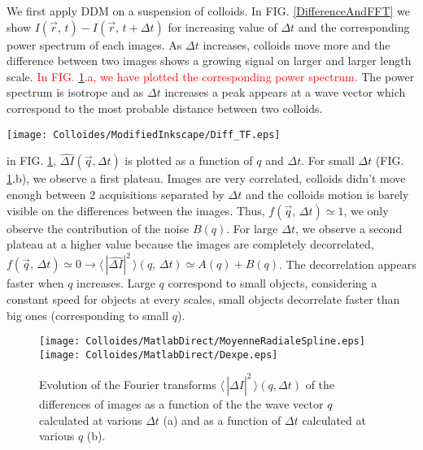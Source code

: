 \documentclass[%
 aip,
 jmp,%
 amsmath,amssymb,
reprint,%
]{revtex4-1}
\begin{document}
We first apply DDM on a suspension of colloids. In FIG. \ref{DifferenceAndFFT} we show $I(\vec{r}, \, t)- I(\vec{r}, \, t+\Delta t)$ for increasing value of $\Delta t$ and the corresponding power spectrum of each images. As $\Delta t$ increases, colloids move more and the difference between two images shows a growing signal on larger and larger length scale. \textcolor{red}{In FIG. \ref{D}.a, we have plotted the corresponding power spectrum.} The power spectrum is isotrope and as $\Delta t$ increases a peak appears at a wave vector which correspond to the most probable distance between two colloids. 

\begin{figure*}
\texttt{[image: Colloides/ModifiedInkscape/Diff\_TF.eps]}
\caption{Image differences of a colloidal suspension and their Fourier transform as a function of $\Delta t$. (a, b, c) Differences between 2 images separated by $\Delta t$. (d, e, f) 2D Fourier transforms of those differences. These differences and Fourier transforms are calculated with $\Delta t = 0.01$ s (a, d), $\Delta t = 1$ s (b, e), $\Delta t = 100$ s (c, f). The unit of the Fourier transforms is arbitrary.}
\label{DifferenceAndFFT}
\end{figure*}


in FIG. \ref{D}, $\widehat{\Delta I}(\vec{q}, \Delta t)$ is plotted as a function of $q$ and $\Delta t$. For small $\Delta t$ (FIG. \ref{D}.b), we observe a first plateau. Images are very correlated, colloids didn't move enough between 2 acquisitions separated by $\Delta t$ and the colloids motion is barely visible on the differences between the images. Thus, $f(\vec{q}, \, \Delta t) \simeq 1$,  we only observe the contribution of the noise $B(q)$. For large $\Delta t$, we observe a second plateau at a higher value because the images are completely decorrelated, $f(\vec{q}, \, \Delta t) \simeq 0 \rightarrow \langle \, |\widehat{\Delta I}|^2 \, \rangle (q, \, \Delta t) \simeq A(q)+B(q)$. The decorrelation appears faster when $q$ increases. Large $q$ correspond to small objects, considering a constant speed for objects at every scales, small objects decorrelate faster than big ones (corresponding to small $q$).

\begin{figure}
	\texttt{[image: Colloides/MatlabDirect/MoyenneRadialeSpline.eps]}\\
	\texttt{[image: Colloides/MatlabDirect/Dexpe.eps]}
	\caption{Evolution of the Fourier transforms $\langle \, |\widehat{\Delta I}|^2 \, \rangle (q, \Delta t)$ of the differences of images as a function of the the wave vector $q$ calculated at various $\Delta t$ (a) and as a function of $\Delta t$ calculated at various $q$ (b).}
	\label{D}
\end{figure}
\end{document}
